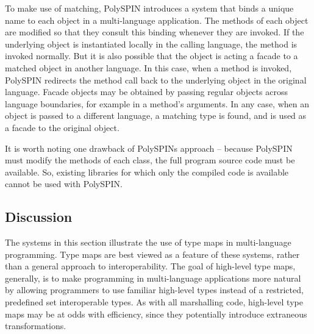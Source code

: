 To make use of matching, PolySPIN introduces a system that binds a unique name to each object in a multi-language application. The methods of each object are modified so that they consult this binding whenever they are invoked. If the underlying object is instantiated locally in the calling language, the method is invoked normally. But it is also possible that the object is acting a facade to a matched object in another language. In this case, when a method is invoked, PolySPIN redirects the method call back to the underlying object in the original language. Facade objects may be obtained by passing regular objects across language boundaries, for example in a method's arguments. In any case, when an object is passed to a different language, a matching type is found, and is used as a facade to the original object.

It is worth noting one drawback of PolySPINs approach -- because PolySPIN must modify the methods of each class, the full program source code must be available. So, existing libraries for which only the compiled code is available cannot be used with PolySPIN.

\subsection{Discussion}

The systems in this section illustrate the use of type maps in multi-language programming. Type maps are best viewed as a feature of these systems, rather than a general approach to interoperability. The goal of high-level type maps, generally, is to make programming in multi-language applications more natural by allowing programmers to use familiar high-level types instead of a restricted, predefined set interoperable types. As with all marshalling code, high-level type maps may be at odds with efficiency, since they potentially introduce extraneous transformations.
